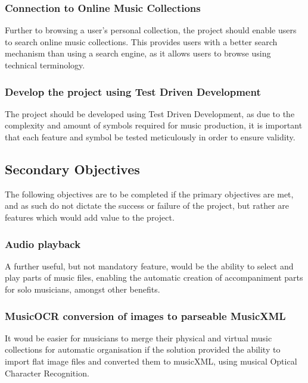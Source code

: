 \documentclass[bibtotocnumbered]{article}
\begin{document}
\subsubsection{Connection to Online Music Collections}
Further to browsing a user's personal collection, the project should enable users to search online music collections. This provides users with a better search mechanism than using a search engine, as it allows users to browse using technical terminology.
\subsubsection{Develop the project using Test Driven Development}
The project should be developed using Test Driven Development, as due to the complexity and amount of symbols required for music production, it is important that each feature and symbol be tested meticulously in order to ensure validity.
\subsection{Secondary Objectives}
The following objectives are to be completed if the primary objectives are met, and as such do not dictate the success or failure of the project, but rather are features which would add value to the project.
\subsubsection{Audio playback}
A further useful, but not mandatory feature, would be the ability to select and play parts of music files, enabling the automatic creation of accompaniment parts for solo musicians, amongst other benefits.
\subsubsection{MusicOCR conversion of images to parseable MusicXML}
It woud be easier for musicians to merge their physical and virtual music collections for automatic organisation if the solution provided the ability to import flat image files and converted them to musicXML, using musical Optical Character Recognition. 
\end{document}
